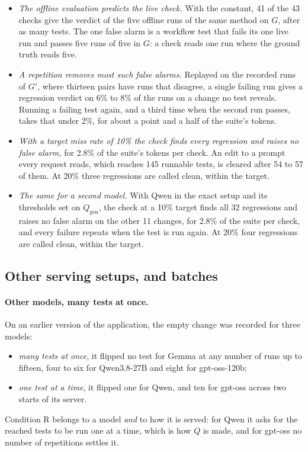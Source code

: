 \documentclass[11pt,a4paper]{article}
\begin{document}
\begin{itemize}
  \item \emph{The offline evaluation predicts the live check.} With the constant, 41 of the 43 checks give the
        verdict of the five offline runs of the same method on $G$, after as many tests. The one false alarm is a
        workflow test that fails its one live run and passes five runs of five in $G$: a check reads one run where
        the ground truth reads five.
  \item \emph{A repetition removes most such false alarms.} Replayed on the recorded runs of $G'$, where thirteen
        pairs have runs that disagree, a single failing run gives a regression verdict on 6\% to 8\% of the runs on
        a change no test reveals. Running a failing test again, and a third time when the second run passes,
        takes that under 2\%, for about a point and a half of the suite's tokens.
  \item \emph{With a target miss rate of 10\% the check finds every regression and raises no false alarm,} for
        2.8\% of the suite's tokens per check. An edit to a prompt every request reads, which reaches 145 runnable
        tests, is cleared after 54 to 57 of them. At 20\% three regressions are called clean, within the target.
  \item \emph{The same for a second model.} With Qwen in the exact setup and its thresholds set on
        $Q_{\mathrm{gen}}$, the check at a 10\% target finds all 32 regressions and raises no false alarm on the
        other 11 changes, for 2.8\% of the suite per check, and every failure repeats when the test is run again.
        At 20\% four regressions are called clean, within the target.
\end{itemize}

\subsection{Other serving setups, and batches}

\paragraph{Other models, many tests at once.} On an earlier version of the application, the empty change was
recorded for three models:
\begin{itemize}
  \item \emph{many tests at once}, it flipped no test for Gemma at any number of runs up to fifteen, four to six
        for Qwen3.8-27B and eight for gpt-oss-120b;
  \item \emph{one test at a time}, it flipped one for Qwen, and ten for gpt-oss across two starts of its server.
\end{itemize}
Condition R belongs to a model \emph{and} to how it is served: for Qwen it asks for the reached tests to be run
one at a time, which is how $Q$ is made, and for gpt-oss no number of repetitions settles it.
\end{document}
